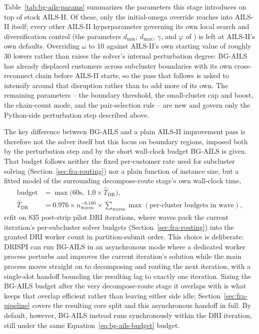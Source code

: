 Table~\ref{tab:bg-ails-params} summarizes the parameters this stage introduces on top of stock AILS-II. Of these, only the initial-omega override reaches into AILS-II itself; every other AILS-II hyperparameter governing its own local search and diversification control (the parameters $d_{\min}$, $d_{\max}$, $\gamma$, and $\varphi$ of \citet{maximoHybridAdaptiveIterated2021}) is left at AILS-II's own defaults. Overriding $\omega$ to 10 against AILS-II's own starting value of roughly 30 lowers rather than raises the solver's internal perturbation degree: BG-AILS has already displaced customers across subcluster boundaries with its own cross-reconnect chain before AILS-II starts, so the pass that follows is asked to intensify around that disruption rather than to add more of its own. The remaining parameters -- the boundary threshold, the small-cluster cap and boost, the chain-count mode, and the pair-selection rule -- are new and govern only the Python-side perturbation step described above.

The key difference between BG-AILS and a plain AILS-II improvement pass is therefore not the solver itself but this focus on boundary regions, imposed both by the perturbation step and by the short wall-clock budget BG-AILS is given. That budget follows neither the fixed per-customer rate used for subcluster solving (Section~\ref{sec:fra-routing}) nor a plain function of instance size, but a fitted model of the surrounding decompose-route stage's own wall-clock time,
\begin{align}
\text{budget} &= \max\bigl(60\text{s},\ 1.0 \times \widehat{T}_{\mathrm{DR}}\bigr), \label{eq:bg-ails-budget}\\
\widehat{T}_{\mathrm{DR}} &= 0.976 \times n_{\mathrm{waves}}^{-0.180} \times \sum_{\text{waves}} \max(\text{per-cluster budgets in wave}), \label{eq:bg-ails-dr-wall}
\end{align}
refit on 835 post-strip pilot DRI iterations, where waves pack the current iteration's per-subcluster solver budgets (Section~\ref{sec:fra-routing}) into the granted DRI worker count in partition-submit order. This choice is deliberate: DRISPI can run BG-AILS in an asynchronous mode where a dedicated worker process perturbs and improves the current iteration's solution while the main process moves straight on to decomposing and routing the next iteration, with a single-slot handoff bounding the resulting lag to exactly one iteration. Sizing the BG-AILS budget after the very decompose-route stage it overlaps with is what keeps that overlap efficient rather than leaving either side idle; Section~\ref{sec:fra-pipeline} covers the resulting core split and this asynchronous handoff in full. By default, however, BG-AILS instead runs synchronously within the DRI iteration, still under the same Equation~\ref{eq:bg-ails-budget} budget.

